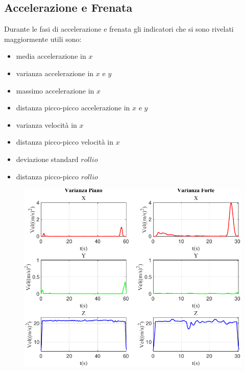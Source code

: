 \documentclass[class=article]{standalone}
\begin{document}
	\subsection{Accelerazione e Frenata}
	Durante le fasi di accelerazione e frenata gli indicatori che si sono rivelati maggiormente utili sono:
	\begin{itemize}
		\item media accelerazione in \(x\)
		\item varianza accelerazione in \(x\) e \(y\)
		\item massimo accelerazione in \(x\)
		\item distanza picco-picco accelerazione in \(x\) e \(y\)
		\item varianza velocità in \(x\)
		\item distanza picco-picco velocità in \(x\)
		\item deviazione standard \(rollio\)
		\item distanza picco-picco \(rollio\)
	\end{itemize}
	
	\begin{center}
		\begin{figure}[h]
			\centering\includegraphics[width=.9\textwidth]{img/lungaFP/Vel/Varianza}
			\caption[]{}
			\label{fig:VelVar_lungaFP}
		\end{figure}
	\end{center}
	
\end{document}
